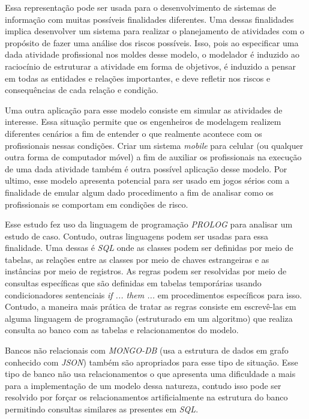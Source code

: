 Essa representação pode ser usada para o desenvolvimento de sistemas de informação com muitas possíveis finalidades diferentes. Uma dessas finalidades implica desenvolver um sistema para realizar o planejamento de atividades com o propósito de fazer uma análise dos riscos possíveis. Isso, pois ao especificar uma dada atividade profissional nos moldes desse modelo, o modelador é induzido ao raciocínio de estruturar a atividade em forma de objetivos, é induzido a pensar em todas as entidades e relações importantes, e deve refletir nos riscos e consequências de cada relação e condição. 

Uma outra aplicação para esse modelo consiste em simular as atividades de interesse. 
Essa situação permite que os engenheiros de modelagem realizem diferentes cenários a fim de entender o que realmente acontece com os profissionais nessas condições. Criar um sistema \textit{mobile} para celular (ou qualquer outra forma de computador móvel) a fim de auxiliar os profissionais na execução de uma dada atividade também é outra possível aplicação desse modelo. Por ultimo, esse modelo apresenta potencial para ser usado em jogos sérios com a finalidade de emular algum dado procedimento a fim 
de analisar como os profissionais se comportam em condições de risco. 

Esse estudo fez uso da linguagem de programação \textit{PROLOG} para analisar um estudo de caso. Contudo, outras linguagens podem ser usadas para essa finalidade. Uma dessas é \textit{SQL} onde as classes podem ser definidas por meio de tabelas, as relações entre as classes por meio de chaves estrangeiras e as instâncias por meio de registros. As regras podem ser resolvidas por meio de consultas específicas que são definidas em tabelas temporárias usando condicionadores sentenciais \textit{if ... them ...} em procedimentos específicos para isso. Contudo, a maneira mais prática de tratar as regras consiste em escrevê-las em alguma linguagem de programação (estruturado em um algoritmo) que realiza consulta ao banco com as tabelas e relacionamentos do modelo. 

Bancos não relacionais com \textit{MONGO-DB} (usa a estrutura de dados em grafo conhecido com \textit{JSON}) também são apropriados para esse tipo de situação. Esse tipo 
de banco não usa relacionamentos o que apresenta uma dificuldade a mais para a implementação de um modelo dessa natureza, contudo isso pode ser resolvido por forçar os relacionamentos artificialmente na estrutura do banco permitindo consultas similares as presentes em \textit{SQL}.

